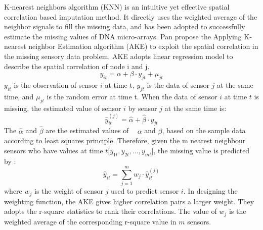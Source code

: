 K-nearest neighbors algorithm (KNN) is an intuitive yet effective spatial correlation based imputation method. It directly uses the weighted average of the neighbor signals to fill the missing data, and has been adopted to successfully estimate the missing values of DNA micro-arrays\cite{Troyanskaya:DNAKNN}.  
Pan\cite{pan2010k} propose the Applying K-nearest neighbor Estimation algorithm (AKE) to exploit the spatial correlation in the missing sensory data problem. 
AKE adopts linear regression model to describe the spatial correlation of node i and j. 
\begin{equation}
y_{it} = \alpha + \beta\cdot y_{jt} + \mu_{jt} 
\end{equation}
$y_{it}$ is the observation of sensor $i$ at time t, $y_{jt}$ is the data of sensor $j$ at the same time, and $\mu_{jt}$ is the random error at time t.   
When the data of sensor $i$ at time $t$ is missing, the estimated value of sensor $i$ by sensor $j$ at the same time is:
\begin{equation}
\hat{y}_{it}^{(j)} =\hat{\alpha} +\hat{\beta}\cdot y_{jt}
\label{ake_j}
\end{equation}
The $\hat{\alpha}$ and $\hat{\beta}$ are the estimated values of  $\alpha$ and $\beta$, based on the sample data according to least squares principle.
Therefore, given the m nearest neighbour sensors who have values at time $t$[$y_{1t}, y_{2t},\dots, y_{mt}$], the missing value is predicted by :   
 \begin{equation}
 \hat{y}_{it} =\sum_{j=1}^m w_j \cdot \hat{y}_{it}^{(j)}
 \label{ake_impute}
 \end{equation}
%
where $w_j$ is the weight of sensor $j$ used to predict sensor $i$. In designing the weighting function, the AKE gives higher correlation pairs a larger weight. They adopts the r-square statistics to rank their correlations. The value of $w_j$ is the weighted average of the corresponding r-square value in $m$ sensors. 

